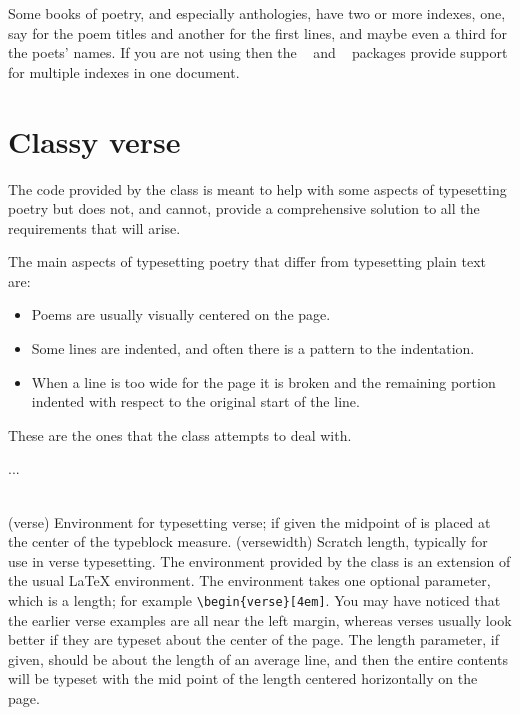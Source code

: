 
   Some books of poetry, and especially anthologies, have two or more
indexes, one, say for the 
poem titles and another for the 
first lines, and maybe even a third for the poets' names. 
If you are not using  then 
the ~\cite{INDEX} and ~\cite{MULTIND}
packages provide support for multiple indexes 
in one document.

\section{Classy verse} 

    The code provided by the  class is meant to help
with some aspects of typesetting poetry but does not, and cannot,
provide a comprehensive solution to all the requirements that
will arise.

    The main aspects of typesetting poetry that differ from typesetting
plain text are:
\begin{itemize}
\item Poems are usually visually centered on the page.
\item Some lines are indented, and often there 
      is a pattern to the indentation.
\item When a line is too wide for the page it is 
      broken and the
      remaining portion indented with respect to the original start
      of the line.
\end{itemize}
These are the ones that the class attempts to deal with.

\begin{syntax}
 ...  \\
\lnc{\versewidth} \\
\end{syntax}
\glossary(verse)%
  {}%
  {Environment for typesetting verse; if given the midpoint of 
   is placed at the center of the typeblock measure.}
\glossary(versewidth)%
  {}%
  {Scratch length, typically for use in verse typesetting.}
The  environment provided by the class is an extension
of the usual LaTeX environment. The environment takes one optional
parameter, which is a length; for example \verb?\begin{verse}[4em]?.
You may have noticed that the earlier verse examples are all
near the left margin, whereas verses usually look better 
if they
are typeset about the center of the page. The length parameter,
if given, should be about the length of an average line, and then
the entire contents will be typeset with the mid 
point of the length centered horizontally on the page.


